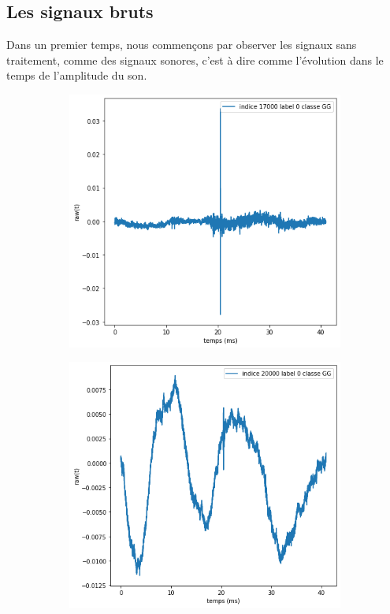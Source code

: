\hypertarget{Signaux-Bruts}{%
\subsection{Les signaux bruts}
\label{Signaux-Bruts}}

Dans un premier temps, nous commençons par observer les signaux sans traitement, comme des signaux sonores, c'est à dire comme l'évolution dans le temps de l'amplitude du son.

\begin{figure}[!h]
\centering
	\begin{subfigure}[b]{0.3\textwidth}
    \includegraphics[width=\textwidth]{./images/indice17000Spectro1Dlabel0classeGGsansprocessingsanszoom.png}
    \caption{}
  	\end{subfigure}
  	\begin{subfigure}[b]{0.3\textwidth}
    \includegraphics[width=\textwidth]{./images/indice20000Spectro1Dlabel9classeZCsansprocessingsanszoom.png}

\end{subfigure}
\end{figure}
